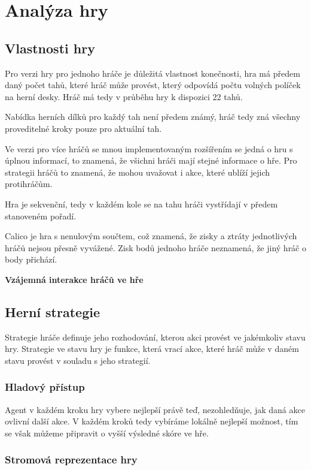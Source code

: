 \chapter{Analýza hry}

\section{Vlastnosti hry}

Pro verzi hry pro jednoho hráče je důležitá vlastnost konečnosti, hra má předem daný počet tahů, které hráč může provést, který odpovídá počtu volných políček na herní desky. Hráč má tedy v průběhu hry k dispozici 22 tahů.

Nabídka herních dílků pro každý tah není předem známý, hráč tedy zná všechny proveditelné kroky pouze pro aktuální tah. 

Ve verzi pro více hráčů se mnou implementovaným rozšířením se jedná o hru s úplnou informací, to znamená, že všichni hráči mají stejné informace o hře. Pro strategii hráčů to znamená, že mohou uvažovat i akce, které ublíží jejich protihráčům.

Hra je sekvenční, tedy v každém kole se na tahu hráči vystřídají v předem stanoveném pořadí. 

Calico je hra s nenulovým součtem, což znamená, že zisky a ztráty jednotlivých hráčů nejsou přesně vyvážené. Zisk bodů jednoho hráče neznamená, že jiný hráč o body přichází.

\textbf{Vzájemná interakce hráčů ve hře}


\section{Herní strategie}

Strategie hráče definuje jeho rozhodování, kterou akci provést ve jakémkoliv stavu hry. Strategie ve stavu hry je funkce, která vrací akce, které hráč může v daném stavu provést v souladu s jeho strategií.


\subsection{Hladový přístup}

Agent v každém kroku hry vybere nejlepší právě teď, nezohledňuje, jak daná akce ovlivní další akce. V každém kroků tedy vybíráme lokálně nejlepší možnost, tím se však můžeme připravit o vyšší výsledné skóre ve hře.

\subsection{Stromová reprezentace hry}

